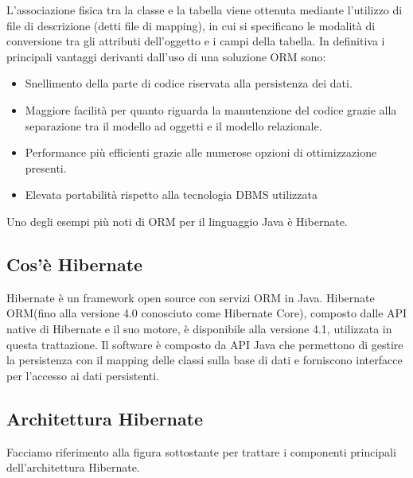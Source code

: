 L'associazione fisica tra la classe e la tabella viene ottenuta mediante l'utilizzo di file di descrizione (detti file di mapping), in cui si specificano le modalit\`a di conversione tra gli attributi dell'oggetto e i campi della tabella. In definitiva i principali vantaggi derivanti dall'uso di una soluzione ORM sono:
\begin{itemize}
\item Snellimento della parte di codice riservata alla persistenza dei dati.
\item Maggiore facilit\`a per quanto riguarda la manutenzione del codice grazie alla separazione tra il modello ad oggetti e il modello relazionale.
\item Performance pi\`u efficienti grazie alle numerose opzioni di ottimizzazione presenti.
\item Elevata portabilit\`a rispetto alla tecnologia DBMS utilizzata
\end{itemize}

Uno degli esempi pi\`u noti di ORM per il linguaggio Java \`e Hibernate.
\subsection{Cos'\`e Hibernate}
Hibernate \`e un framework open source
con servizi ORM in Java. Hibernate ORM(fino alla versione 4.0 conosciuto come Hibernate Core), composto dalle API native di Hibernate e il suo motore, \`e disponibile alla versione 4.1, utilizzata in questa trattazione.
Il software \`e composto da API Java che permettono di gestire la persistenza con il mapping delle classi sulla base di dati e forniscono interfacce per l'accesso ai dati persistenti.
\subsection{Architettura Hibernate}
Facciamo riferimento alla figura sottostante per  trattare i componenti principali dell'architettura Hibernate.

